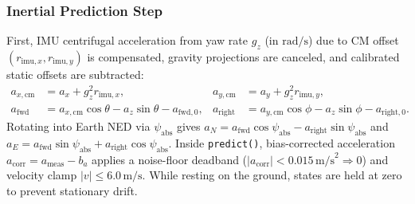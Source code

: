 \documentclass[11pt,a4paper]{article}
\begin{document}
\subsubsection*{Inertial Prediction Step}
First, IMU centrifugal acceleration from yaw rate $g_z$ (in $\text{rad/s}$) due to CM offset $(r_{\text{imu},x}, r_{\text{imu},y})$ is compensated, gravity projections are canceled, and calibrated static offsets are subtracted:
\begin{align}
  a_{x,\text{cm}} &= a_x + g_z^2 r_{\text{imu},x}, & a_{y,\text{cm}} &= a_y + g_z^2 r_{\text{imu},y}, \\
  a_{\text{fwd}}   &= a_{x,\text{cm}}\cos\theta - a_z\sin\theta - a_{\text{fwd},0}, &
  a_{\text{right}} &= a_{y,\text{cm}}\cos\phi   - a_z\sin\phi   - a_{\text{right},0}.
\end{align}
Rotating into Earth NED via $\psi_{\text{abs}}$ gives $a_N = a_{\text{fwd}}\cos\psi_{\text{abs}} - a_{\text{right}}\sin\psi_{\text{abs}}$ and $a_E = a_{\text{fwd}}\sin\psi_{\text{abs}} + a_{\text{right}}\cos\psi_{\text{abs}}$. Inside \texttt{predict()}, bias-corrected acceleration $a_{\text{corr}} = a_{\text{meas}} - b_a$ applies a noise-floor deadband ($|a_{\text{corr}}| < 0.015\,\text{m/s}^2 \Rightarrow 0$) and velocity clamp $|v| \le 6.0\,\text{m/s}$. While resting on the ground, states are held at zero to prevent stationary drift.
\end{document}
